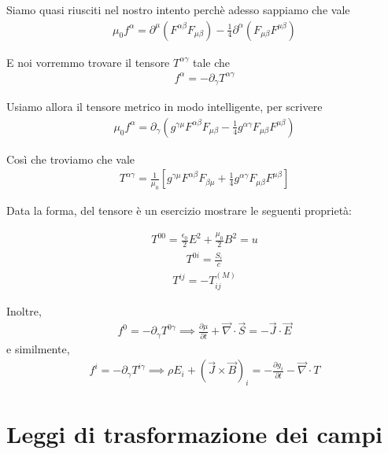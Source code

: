 \documentclass{report}
\begin{document}
Siamo quasi riusciti nel nostro intento perchè adesso sappiamo che vale 
\begin{align}
    \mu_0f^\alpha = \partial^{\mu}(F^{\alpha\beta}F_{\mu\beta}) - \frac{1}{4}\partial^\alpha (F_{\mu\beta}F^{\mu\beta})
\end{align}

E noi vorremmo trovare il tensore \(T^{\alpha \gamma}\) tale che 
\begin{align}
    f^{\alpha} = -\partial_\gamma T^{\alpha \gamma}
\end{align}

Usiamo allora il tensore metrico in modo intelligente, per scrivere
\begin{align}
    \mu_0 f^\alpha = \partial_\gamma (g^{\gamma \mu}F^{\alpha \beta}F_{\mu\beta} - \frac{1}{4}g^{\alpha\gamma}F_{\mu \beta}F^{\mu\beta})
\end{align}

Così che troviamo che vale 
\begin{align}
    T^{\alpha \gamma} = \frac{1}{\mu_0}[g^{\gamma \mu}F^{\alpha \beta}F_{\beta\mu} + \frac{1}{4}g^{\alpha\gamma}F_{\mu \beta}F^{\mu\beta}]
\end{align}

Data la forma, del tensore è un esercizio mostrare le seguenti proprietà: 

    \begin{align}
        T^{00} = \frac{\epsilon_0}{2}E^2 + \frac{\mu_0}{2}B^2 = u
    \end{align}
    \begin{align}
        T^{0i} = \frac{S_i}{c}
    \end{align}
    \begin{align}
        T^{ij} = -T^{(M)}_{ij}
    \end{align}

Inoltre, 
\begin{align}
    f^0 = -\partial_\gamma T^{0 \gamma} \implies \frac{\partial \mu}{\partial t} + \vec{\nabla}\cdot \vec{S} = -\vec{J}\cdot \vec{E}
\end{align}
e similmente, 
\begin{align}
    f^{i} = -\partial_\gamma T^{i \gamma} \implies \rho E_i + (\vec{J}\times \vec{B})_i = -\frac{\partial g_i}{\partial t} - \vec{\nabla}\cdot T
\end{align}


\section{Leggi di trasformazione dei campi}
\end{document}
